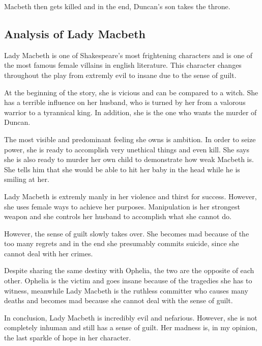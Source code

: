 \documentclass[]{article}
\begin{document}
Macbeth then gets killed and in the end, Duncan's son takes the throne.

\subsection*{Analysis of Lady Macbeth}
\hspace{1em}
Lady Macbeth is one of Shakespeare's most frightening characters and is one of the most famous female villains in english literature. This character changes throughout the play from extremly evil to insane due to the sense of guilt.

At the beginning of the story, she is vicious and can be compared to a witch. She has a terrible influence on her husband, who is turned by her from a valorous warrior to a tyrannical king. In addition, she is the one who wants the murder of Duncan. 

The most visible and predominant feeling she owns is ambition. In order to seize power, she is ready to accomplish very unethical things and even kill. She says she is also ready to murder her own child to demonstrate how weak Macbeth is. She tells him that she would be able to hit her baby in the head while he is smiling at her.

Lady Macbeth is extremly manly in her violence and thirst for success. However, she uses female ways to achieve her purposes. Manipulation is her strongest weapon and she controls her husband to accomplish what she cannot do.

However, the sense of guilt slowly takes over. She becomes mad because of the too many regrets and in the end she presumably commits suicide, since she cannot deal with her crimes. 

Despite sharing the same destiny with Ophelia, the two are the opposite of each other. Ophelia is the victim and goes insane because of the tragedies she has to witness, meanwhile Lady Macbeth is the ruthless committer who causes many deaths and becomes mad because she cannot deal with the sense of guilt.

In conclusion, Lady Macbeth is incredibly evil and nefarious. However, she is not completely inhuman and still has a sense of guilt. Her madness is, in my opinion, the last sparkle of hope in her character. 
\end{document}

